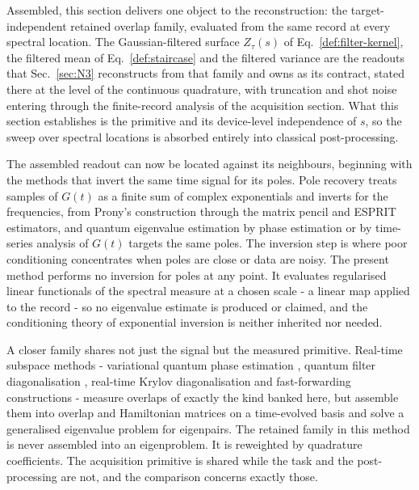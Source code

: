 Assembled, this section delivers one object to the reconstruction: the target-independent retained overlap family, evaluated from the same record at every spectral location. The Gaussian-filtered surface $Z_\tau(s)$ of Eq.~\eqref{def:filter-kernel}, the filtered mean of Eq.~\eqref{def:staircase} and the filtered variance are the readouts that Sec.~\ref{sec:N3} reconstructs from that family and owns as its contract, stated there at the level of the continuous quadrature, with truncation and shot noise entering through the finite-record analysis of the acquisition section. What this section establishes is the primitive and its device-level independence of $s$, so the sweep over spectral locations is absorbed entirely into classical post-processing.

The assembled readout can now be located against its neighbours, beginning with the methods that invert the same time signal for its poles. Pole recovery treats samples of $G(t)$ as a finite sum of complex exponentials and inverts for the frequencies, from Prony's construction \cite{prony1795essai} through the matrix pencil \cite{hua1990pencil} and ESPRIT \cite{roy1989esprit} estimators, and quantum eigenvalue estimation by phase estimation \cite{obrien2019qpe} or by time-series analysis of $G(t)$ \cite{somma2019eigenvalue} targets the same poles. The inversion step is where poor conditioning concentrates when poles are close or data are noisy. The present method performs no inversion for poles at any point. It evaluates regularised linear functionals of the spectral measure at a chosen scale - a linear map applied to the record - so no eigenvalue estimate is produced or claimed, and the conditioning theory of exponential inversion is neither inherited nor needed.

A closer family shares not just the signal but the measured primitive. Real-time subspace methods - variational quantum phase estimation \cite{klymko2022vqpe}, quantum filter diagonalisation \cite{parrish2019qfd}, real-time Krylov diagonalisation \cite{shen2023realtimekrylov} and fast-forwarding constructions \cite{cortes2022fastforward} - measure overlaps of exactly the kind banked here, but assemble them into overlap and Hamiltonian matrices on a time-evolved basis and solve a generalised eigenvalue problem for eigenpairs. The retained family in this method is never assembled into an eigenproblem. It is reweighted by quadrature coefficients. The acquisition primitive is shared while the task and the post-processing are not, and the comparison concerns exactly those.

